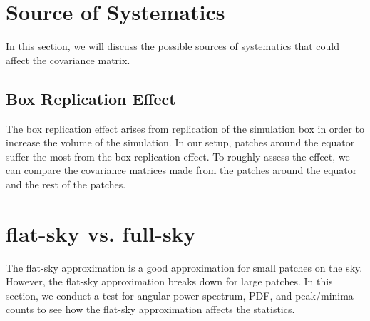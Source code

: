 \section{Source of Systematics}
In this section, we will discuss the possible sources of systematics that could affect the covariance matrix. 

\subsection{Box Replication Effect}
The box replication effect arises from replication of the simulation box in order to increase the volume of the simulation. In our setup, patches around the equator suffer the most from the box replication effect. To roughly assess the effect, we can compare the covariance matrices made from the patches around the equator and the rest of the patches.

\section{flat-sky vs. full-sky}
The flat-sky approximation is a good approximation for small patches on the sky. However, the flat-sky approximation breaks down for large patches. In this section, we conduct a test for angular power spectrum, PDF, and peak/minima counts to see how the flat-sky approximation affects the statistics.